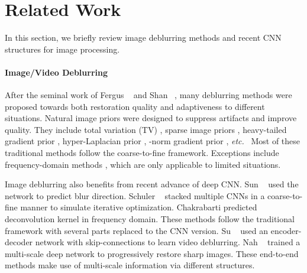 \documentclass[10pt,twocolumn,letterpaper]{article}
\def\etc{\emph{etc.}} \def\vs{\emph{vs}.}
\begin{document}
\section{Related Work} \label{sec:related}
In this section, we briefly review image deblurring methods and recent CNN structures for image processing.

\vspace{-0.1in}
\paragraph{Image/Video Deblurring}
After the seminal work of Fergus \etal~\cite{fergus2006removing} and Shan \etal~\cite{shan2008high}, many deblurring methods were proposed towards both restoration quality and adaptiveness to different situations. Natural image priors were designed to suppress artifacts and improve quality. They include total variation (TV) \cite{chan1998total}, sparse image priors \cite{levin2009understanding}, heavy-tailed gradient prior \cite{shan2008high}, hyper-Laplacian prior \cite{krishnan2009fast}, -norm gradient prior \cite{xu2013unnatural}, \etc~
Most of these traditional methods follow the coarse-to-fine framework. Exceptions include frequency-domain methods \cite{delbracio2015burst,goldstein2012blur}, which are only applicable to limited situations.

Image deblurring also benefits from recent advance of deep CNN. Sun \etal~\cite{sun2015learning} used the network to predict blur direction. Schuler \etal~\cite{schuler2016learning} stacked multiple CNNs in a coarse-to-fine manner to simulate iterative optimization. Chakrabarti \cite{chakrabarti2016neural} predicted deconvolution kernel in frequency domain. These methods follow the traditional framework with several parts replaced to the CNN version. Su \etal~\cite{su2017deep} used an encoder-decoder network with skip-connections to learn video deblurring. Nah \etal~\cite{nah2017deep} trained a multi-scale deep network to progressively restore sharp images. These end-to-end methods make use of multi-scale information via different structures.

\vspace{-0.1in}
\end{document}
